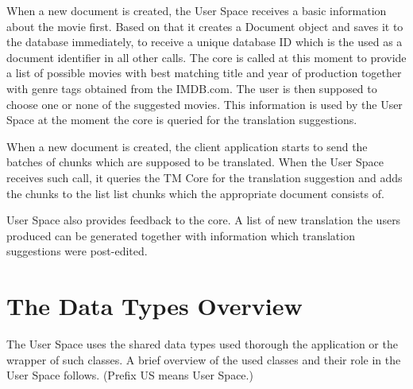 When a new document is created, the User Space receives a basic information about the movie first. Based on that it creates a Document object and saves it to the database immediately, to receive a unique  database ID which is the used as a document identifier in all other calls. The core is called at this moment to provide a list of possible movies with best matching title and year of production together with genre tags obtained from the IMDB.com. The user is then supposed to choose one or none of the suggested movies. This information is used by the User Space at the moment the core is queried for the translation suggestions.

When a new document is created, the client application starts to send the batches of chunks which are supposed to be translated. When the User Space receives such call, it queries the TM Core for the translation suggestion and adds the chunks to the list list chunks which the appropriate document consists of.

User Space also provides feedback to the core. A list of new translation the users produced can be generated together with information which translation suggestions were post-edited.

\section{The Data Types Overview}

The User Space uses the shared data types used thorough the application or the wrapper of such classes. A brief overview of the used classes and their role in the User Space follows. (Prefix US means User Space.)

